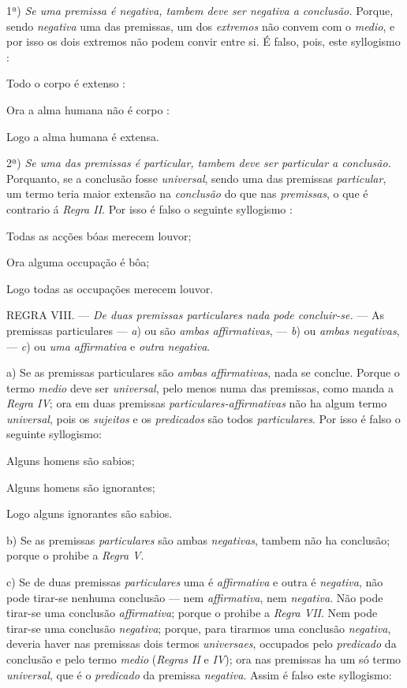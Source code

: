 1ª) \emph{Se uma premissa é negativa, tambem deve ser negativa a conclusão.} Porque, sendo \emph{negativa} uma das premissas, um dos \emph{extremos} não convem com o \emph{medio}, e por isso os dois extremos não podem convir entre si. É falso, pois, este syllogismo :

Todo o corpo é extenso :

Ora a alma humana não é corpo :

Logo a alma humana é extensa.

2ª) \emph{Se uma das premissas é particular, tambem deve ser particular a conclusão.} Porquanto, se a conclusão fosse \emph{universal}, sendo uma das premissas \emph{particular}, um termo teria maior extensão na \emph{conclusão} do que nas \emph{premissas}, o que é contrario á \emph{Regra II}. Por isso é falso o seguinte syllogismo :

Todas as acções bóas merecem louvor;

Ora alguma occupação é bôa;

Logo todas as occupações merecem louvor.

\textsc{REGRA} VIII. --- \emph{De duas premissas particulares nada pode concluir-se.} --- As premissas particulares --- \emph{a}) ou são \emph{ambas affirmativas}, --- \emph{b}) ou \emph{ambas negativas}, --- \emph{c}) ou \emph{uma affirmativa} e \emph{outra negativa}.

 a) Se as premissas particulares são \emph{ambas affirmativas}, nada se conclue. Porque o termo \emph{medio} deve ser \emph{universal}, pelo menos numa das premissas, como manda a \emph{Regra IV}; ora em duas premissas \emph{particulares-affirmativas} não ha algum termo \emph{universal}, pois os \emph{sujeitos} e os \emph{predicados} são todos \emph{particulares}. Por isso é falso o seguinte syllogismo:

Alguns homens são sabios;

Alguns homens são ignorantes;

Logo alguns ignorantes são sabios.

b) Se as premissas \emph{particulares} são ambas \emph{negativas}, tambem não ha conclusão; porque o prohibe a \emph{Regra V}.

c) Se de duas premissas \emph{particulares} uma é \emph{affirmativa} e outra é \emph{negativa}, não pode tirar-se nenhuma conclusão --- nem \emph{affirmativa}, nem \emph{negativa}. Não pode tirar-se uma conclusão \emph{affirmativa}; porque o prohibe a \emph{Regra VII}. Nem pode tirar-se uma conclusão \emph{negativa}; porque, para tirarmos uma conclusão \emph{negativa}, deveria haver nas premissas dois termos \emph{universaes}, occupados pelo \emph{predicado} da conclusão e pelo termo \emph{medio} (\emph{Regras II} e \emph{IV}); ora nas premissas ha um só termo \emph{universal}, que é o \emph{predicado} da premissa \emph{negativa}. Assim é falso este syllogismo:

